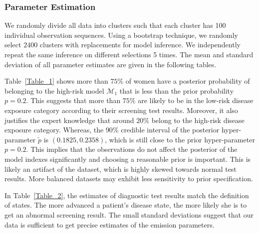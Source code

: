 \documentclass{article}
\begin{document}
\subsubsection{Parameter Estimation}
We randomly divide all data into clusters such that each cluster has 100 individual observation sequences. Using a bootstrap technique, we randomly select $2400$ clusters with replacements for model inference. We independently repeat the same inference on different selections 5 times. The mean and standard deviation of all parameter estimates are given in the following tables.

Table~\ref{Table_1} shows more than $75\%$ of women have a posterior probability of belonging to the high-risk model $\mathcal{M}_1$ that is less than the prior probability $p = 0.2$. This suggests that more than $75\%$ are likely to be in the low-risk disease exposure category according to their screening test results. Moreover, it also justifies the expert knowledge that around $20\%$  belong to the high-risk disease exposure category. Whereas, the $90\%$ credible interval of the posterior hyper-parameter $\tilde{p}$ is $(0.1825, 0.2358)$, which is still close to the prior hyper-parameter $p = 0.2$. 
This implies that the observations do not affect the posterior of the model indexes significantly and choosing a reasonable prior is important.  This is likely an artifact of the dataset, which is highly skewed towards normal test results.  More balanced datasets may exhibit less sensitivity to prior specification. 

\begin{table}[ht!]
	\centering
	\caption{Maximum likelihood estimates of quantiles of the posterior probability for Model 1.}
	\label{Table_1}
\end{table}


In Table~\ref{Table_2}, the estimates of diagnostic test results match the definition of states. The more advanced a patient's disease state, the more likely she is to get an abnormal screening result. The small standard deviations suggest that our data is sufficient to get precise estimates of the emission parameters. 
\end{document}
